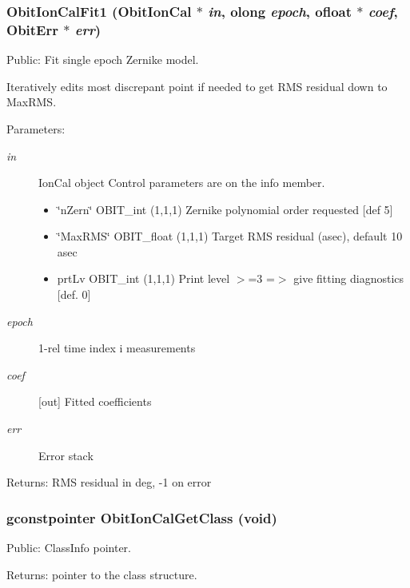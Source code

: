 \subsubsection{ Obit\-Ion\-Cal\-Fit1 ({\bf Obit\-Ion\-Cal} $\ast$ {\em in}, {\bf olong} {\em epoch}, {\bf ofloat} $\ast$ {\em coef}, {\bf Obit\-Err} $\ast$ {\em err})}\label{ObitIonCal_8c_a48}


Public: Fit single epoch Zernike model. 

Iteratively edits most discrepant point if needed to get RMS residual down to Max\-RMS. \begin{Desc}
\item[Parameters:]
\begin{description}
\item[{\em in}]Ion\-Cal object Control parameters are on the info member. \begin{itemize}
\item \char`\"{}n\-Zern\char`\"{} OBIT\_\-int (1,1,1) Zernike polynomial order requested [def 5] \item \char`\"{}Max\-RMS\char`\"{} OBIT\_\-float (1,1,1) Target RMS residual (asec), default 10 asec \item prt\-Lv OBIT\_\-int (1,1,1) Print level $>$=3 =$>$ give fitting diagnostics [def. 0] \end{itemize}
\item[{\em epoch}]1-rel time index i measurements \item[{\em coef}][out] Fitted coefficients \item[{\em err}]Error stack \end{description}
\end{Desc}
\begin{Desc}
\item[Returns:]RMS residual in deg, -1 on error \end{Desc}
\subsubsection{\setlength{\rightskip}{0pt plus 5cm}gconstpointer Obit\-Ion\-Cal\-Get\-Class (void)}\label{ObitIonCal_8c_a41}


Public: Class\-Info pointer. 

\begin{Desc}
\item[Returns:]pointer to the class structure. \end{Desc}
